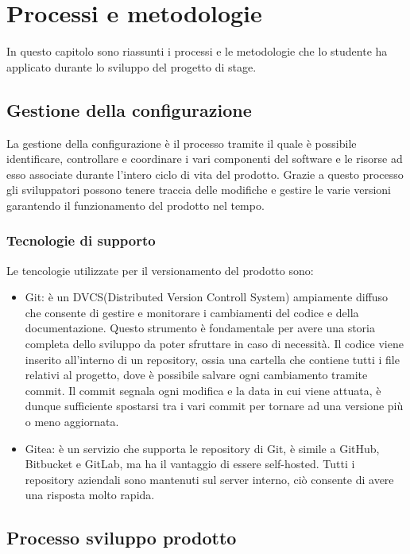 \chapter{Processi e metodologie}
\label{cap:processi-metodologie}

In questo capitolo sono riassunti i processi e le metodologie che lo studente ha applicato durante lo sviluppo del progetto di stage. 

\section{Gestione della configurazione}
La gestione della configurazione è il processo tramite il quale è possibile identificare, controllare e coordinare i vari componenti del software e le risorse ad esso associate durante l'intero ciclo di vita del prodotto. Grazie a questo processo gli sviluppatori possono tenere traccia delle modifiche e gestire le varie versioni garantendo il funzionamento del prodotto nel tempo.

\subsection{Tecnologie di supporto}
Le tencologie utilizzate per il versionamento del prodotto sono:
\begin{itemize}
    \item Git: è un DVCS(Distributed Version Controll System) ampiamente diffuso che consente di gestire e monitorare i cambiamenti del codice e della documentazione. Questo strumento è fondamentale per avere una storia completa dello sviluppo da poter sfruttare in caso di necessità. Il codice viene inserito all'interno di un repository, ossia una cartella che contiene tutti i file relativi al progetto, dove è possibile salvare ogni cambiamento tramite commit. Il commit segnala ogni modifica e la data in cui viene attuata, è dunque sufficiente spostarsi tra i vari commit per tornare ad una versione più o meno aggiornata.    
    \item Gitea: è un servizio che supporta le repository di Git, è simile a GitHub, Bitbucket e GitLab, ma ha il vantaggio di essere self-hosted. 
    Tutti i repository aziendali sono mantenuti sul server interno, ciò consente di avere una risposta molto rapida.

\end{itemize}

\section{Processo sviluppo prodotto}



